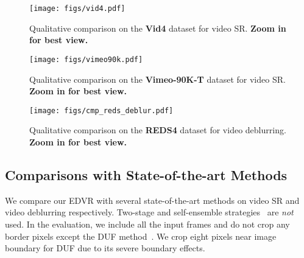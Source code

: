 \documentclass[10pt,twocolumn,letterpaper]{article}
\begin{document}
\begin{figure*}[!th]
	\vspace{-0.5cm}
	\begin{center}
		\texttt{[image: figs/vid4.pdf]}
		\vspace{-0.7cm}
		\caption{Qualitative comparison on the \textbf{Vid4} dataset for  video SR. \textbf{Zoom in for best view.}}
		\label{fig:sr_vid4}
	\end{center}
	\vspace{-0.3cm}
\end{figure*}
\begin{figure*}[!th]
	\vspace{-0.35cm}
	\begin{center}
		\texttt{[image: figs/vimeo90k.pdf]}
		\vspace{-0.7cm}
		\caption{Qualitative comparison on the \textbf{Vimeo-90K-T} dataset for  video SR. \textbf{Zoom in for best view.}}
		\label{fig:sr_vimeo90k}
	\end{center}
	\vspace{-0.35cm}
\end{figure*}
\begin{figure*}[!th]
	\vspace{-0.3cm}
	\begin{center}
		\texttt{[image: figs/cmp\_reds\_deblur.pdf]}
		\vspace{-0.7cm}
		\caption{Qualitative comparison on the \textbf{REDS4} dataset for video deblurring. \textbf{Zoom in for best view.}}
		\label{fig:deblur:reds}
	\end{center}
	\vspace{-0.3cm}
\end{figure*}


\subsection{Comparisons with State-of-the-art Methods}
We compare our EDVR with several state-of-the-art methods on video SR and video deblurring respectively.
Two-stage and self-ensemble strategies~\cite{lim2017enhanced} are \textit{not} used.
In the evaluation, we include all the input frames and do not crop any border pixels except the DUF method~\cite{jo2018deep}. We crop eight pixels near image boundary for DUF due to its severe boundary effects.
\end{document}
